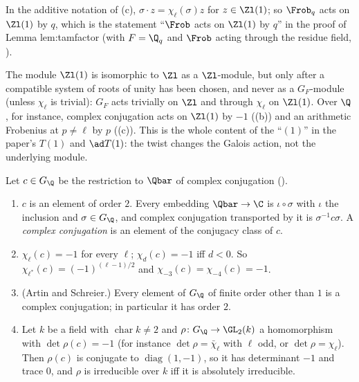 In the additive notation of (c), $\sigma\cdot z=\chi_\ell(\sigma)z$ for $z\in\Zl(1)$; so $\Frob_q$ acts on $\Zl(1)$ by $q$, which is the
statement ``$\Frob$ acts on $\Zl(1)$ by $q$'' in the proof of Lemma lem:tamfactor (with $F=\Q_q$ and $\Frob$ acting through the residue field, ).

The module $\Zl(1)$ is isomorphic to $\Zl$ as a $\Zl$-module, but only after a compatible system of roots of unity has been chosen, and never as a $G_F$-module
(unless $\chi_\ell$ is trivial): $G_F$ acts trivially on $\Zl$ and through $\chi_\ell$ on $\Zl(1)$. Over $\Q$, for instance, complex conjugation acts on $\Zl(1)$ by
$-1$ ((b)) and an arithmetic Frobenius at $p\ne\ell$ by $p$ ((c)). This is the whole content of the
``$(1)$'' in the paper's $T(1)$ and $\ad T(1)$: the twist changes the Galois action, not the underlying module.

\begin{proposition}\label{prop:galois:complex-conjugation}
Let $c\in G_\Q$ be the restriction to $\Qbar$ of complex conjugation ().
\begin{enumerate}[label=(\alph*)]
\item $c$ is an element of order $2$. Every embedding $\Qbar\to\C$ is $\iota\circ\sigma$ with $\iota$ the inclusion and $\sigma\in G_\Q$, and complex conjugation transported
by it is $\sigma^{-1}c\sigma$. A \emph{complex conjugation} is an element of the conjugacy class of $c$.
\item $\chi_\ell(c)=-1$ for every $\ell$; $\chi_d(c)=-1$ iff $d<0$. So $\chi_{\ell^*}(c)=(-1)^{(\ell-1)/2}$ and $\chi_{-3}(c)=\chi_{-4}(c)=-1$.
\item (Artin and Schreier.) Every element of $G_\Q$ of finite order other than $1$ is a complex conjugation; in particular it has order $2$.
\item Let $k$ be a field with $\operatorname{char}k\ne2$ and $\rho\colon G_\Q\to\GL_2(k)$ a homomorphism with $\det\rho(c)=-1$ (for instance $\det\rho=\bar\chi_\ell$ with
$\ell$ odd, or $\det\rho=\chi_\ell$). Then $\rho(c)$ is conjugate to $\operatorname{diag}(1,-1)$, so it has determinant $-1$ and trace $0$, and $\rho$ is irreducible over
$k$ iff it is absolutely irreducible.
\end{enumerate}
\end{proposition}

